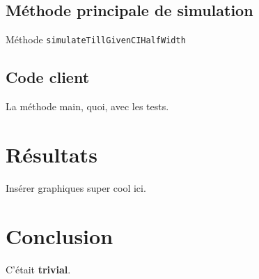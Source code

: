\documentclass[paper=a4, fontsize=13pt]{scrartcl}
\begin{document}
\subsection{Méthode principale de simulation}
Méthode \texttt{simulateTillGivenCIHalfWidth}

\subsection{Code client}
La méthode main, quoi, avec les tests.

\section{Résultats}
Insérer graphiques super cool ici.

\section{Conclusion}
C'était \textbf{trivial}.
\end{document}
